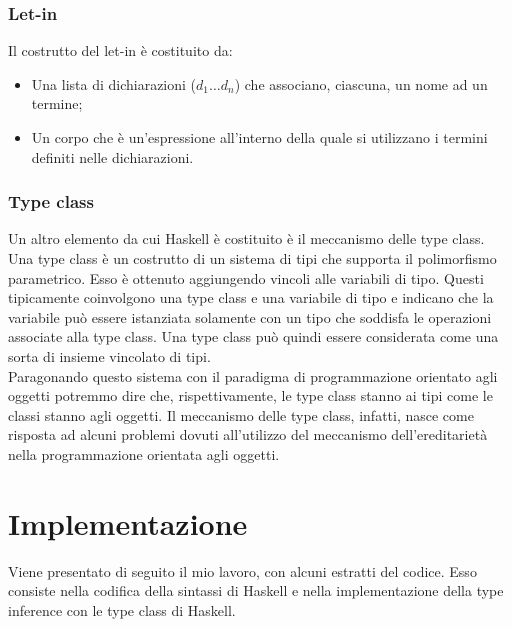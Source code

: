 \documentclass[12pt,a4paper,openright,twoside]{report}
\begin{document}
\subsection{Let-in}
Il costrutto del let-in è costituito da:
\begin{itemize}
 \item Una lista di dichiarazioni ($d_1 \ldots d_n$) che associano, ciascuna, un nome ad un termine;
 \item Un corpo che è un'espressione all'interno della quale si utilizzano i termini definiti nelle dichiarazioni.
\end{itemize}

\subsection{Type class}
Un altro elemento da cui Haskell è costituito è il meccanismo delle type class. Una type class è un costrutto di un sistema di tipi che supporta il polimorfismo parametrico. Esso è ottenuto aggiungendo vincoli alle variabili di tipo. Questi tipicamente coinvolgono una type class e una variabile di tipo e indicano che la variabile può essere istanziata solamente con un tipo che soddisfa le operazioni associate alla type class. Una type class può quindi essere considerata come una sorta di insieme vincolato di tipi.\\
Paragonando questo sistema con il paradigma di programmazione orientato agli oggetti potremmo dire che, rispettivamente, le type class stanno ai tipi come le classi stanno agli oggetti. Il meccanismo delle type class, infatti, nasce come risposta ad alcuni problemi dovuti all'utilizzo del meccanismo dell'ereditarietà nella programmazione orientata agli oggetti.

\clearpage{\pagestyle{empty}\cleardoublepage}	%


\chapter{Implementazione}		%


Viene presentato di seguito il mio lavoro, con alcuni estratti del codice. Esso consiste nella codifica della sintassi di Haskell e nella implementazione della type inference con le type class di Haskell.
\end{document}

